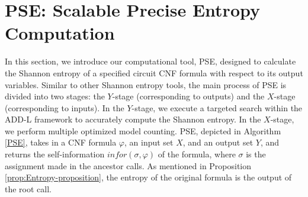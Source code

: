 \section{PSE: Scalable Precise Entropy Computation}
\label{sec:PSE}

In this section, we introduce our computational tool, PSE, designed to calculate the Shannon entropy of a specified circuit CNF formula with respect to its output variables.
Similar to other Shannon entropy tools, the main process of PSE is divided into two stages: the $Y$-stage (corresponding to outputs) and the $X$-stage (corresponding to inputs).
In the $Y$-stage, we execute a targeted search within the ADD-L framework to accurately compute the Shannon entropy.
In the $X$-stage, we perform multiple optimized model counting.
PSE, depicted in Algorithm \ref{PSE}, takes in a CNF formula $\varphi$, an input set $X$, and an output set $Y$, and returns the self-information $\mathit{infor}(\sigma, \varphi)$ of the formula, where $\sigma$ is the assignment made in the ancestor calls.
As mentioned in Proposition \ref{prop:Entropy-proposition}, the entropy of the original formula is the output of the root call.


